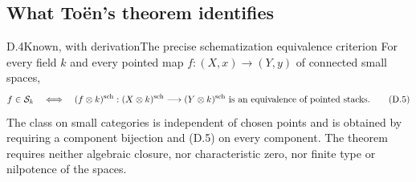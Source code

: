 \subsection{What To\"en's theorem identifies}

\begin{claim}{D.4}{Known, with derivation}{The precise schematization equivalence criterion}
\label{D4}
For every field $k$ and every pointed map $f:(X,x)\to(Y,y)$ of
connected small spaces,
\[
 f\in\mathcal S_k\quad\Longleftrightarrow\quad
 (f\otimes k)^{\mathrm{sch}}:(X\otimes k)^{\mathrm{sch}}\longrightarrow
                         (Y\otimes k)^{\mathrm{sch}}
 \text{ is an equivalence of pointed stacks}.
 \tag{D.5}
\]
The class on small categories is independent of chosen points and is
obtained by requiring a component bijection and (D.5) on every
component. The theorem requires neither algebraic closure, nor
characteristic zero, nor finite type or nilpotence of the spaces.
\end{claim}
